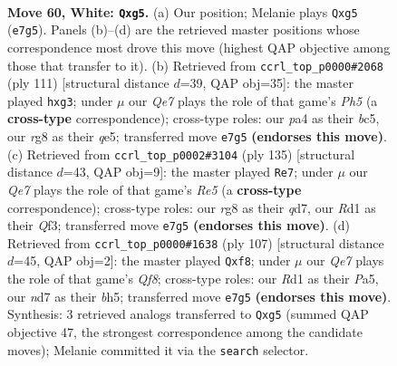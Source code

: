\documentclass[11pt]{article}
\begin{document}
\clearpage

\begin{figure}[p]\centering
\begin{subfigure}{0.46\textwidth}\centering
\resizebox{\linewidth}{!}{%
\newchessgame
\chessboard[
  setfen={6rk/3nQ3/8/6qp/p2p4/P7/8/3R3K w - - 0 60},
  showmover=false,
  pgfstyle=straightmove, color=movearrow, markmove={e7-g5}
]}
\caption{}
\end{subfigure}\hfill
\begin{subfigure}{0.46\textwidth}\centering
\resizebox{\linewidth}{!}{%
\newchessgame
\chessboard[
  setfen={8/7k/6q1/2B1Q3/7p/5PRP/2Pr4/7K b - - 0 56},
  showmover=false,
  pgfstyle=straightmove, color=movearrow, markmove={h4-g3}
]}
\caption{}
\end{subfigure}
\\[4pt]
\begin{subfigure}{0.46\textwidth}\centering
\resizebox{\linewidth}{!}{%
\newchessgame
\chessboard[
  setfen={8/3Q1k1p/1P1p4/8/4r3/5qPK/8/6R1 b - - 12 68},
  showmover=false,
  pgfstyle=straightmove, color=movearrow, markmove={e4-e7}
]}
\caption{}
\end{subfigure}\hfill
\begin{subfigure}{0.46\textwidth}\centering
\resizebox{\linewidth}{!}{%
\newchessgame
\chessboard[
  setfen={5QR1/8/7k/p2p3B/3P3P/4r3/1K6/5q2 b - - 0 54},
  showmover=false,
  pgfstyle=straightmove, color=movearrow, markmove={f1-f8}
]}
\caption{}
\end{subfigure}
\caption{\textbf{Move 60, White: \texttt{Qxg5}.} (a) Our position; Melanie plays \texttt{Qxg5} (\texttt{e7g5}). Panels (b)--(d) are the retrieved master positions whose correspondence most drove this move (highest QAP objective among those that transfer to it). (b) Retrieved from \texttt{ccrl\_top\_p0000\#2068} (ply 111) [structural distance $d$=39, QAP obj=35]: the master played \texttt{hxg3}; under $\mu$ our \emph{Qe7} plays the role of that game's \emph{Ph5} (a \textbf{cross-type} correspondence); cross-type roles: our \emph{p}a4 as their \emph{b}c5, our \emph{r}g8 as their \emph{q}e5; transferred move \texttt{e7g5} \textbf{(endorses this move)}. (c) Retrieved from \texttt{ccrl\_top\_p0002\#3104} (ply 135) [structural distance $d$=43, QAP obj=9]: the master played \texttt{Re7}; under $\mu$ our \emph{Qe7} plays the role of that game's \emph{Re5} (a \textbf{cross-type} correspondence); cross-type roles: our \emph{r}g8 as their \emph{q}d7, our \emph{R}d1 as their \emph{Q}f3; transferred move \texttt{e7g5} \textbf{(endorses this move)}. (d) Retrieved from \texttt{ccrl\_top\_p0000\#1638} (ply 107) [structural distance $d$=45, QAP obj=2]: the master played \texttt{Qxf8}; under $\mu$ our \emph{Qe7} plays the role of that game's \emph{Qf8}; cross-type roles: our \emph{R}d1 as their \emph{P}a5, our \emph{n}d7 as their \emph{b}h5; transferred move \texttt{e7g5} \textbf{(endorses this move)}. Synthesis: 3 retrieved analogs transferred to \texttt{Qxg5} (summed QAP objective 47, the strongest correspondence among the candidate moves); Melanie committed it via the \texttt{search} selector.}
\label{fig:thought-m118}
\end{figure}
\end{document}
